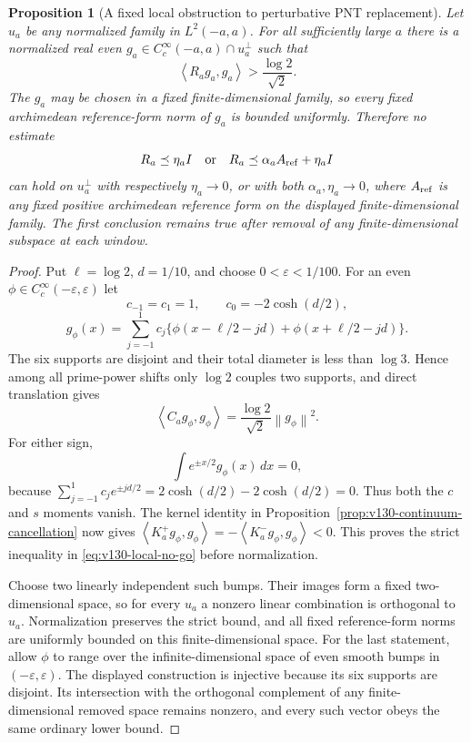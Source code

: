 \documentclass[11pt]{article}
\newtheorem{proposition}[theorem]{Proposition}
\theoremstyle{remark}
\newcommand{\norm}[1]{\left\lVert #1\right\rVert}
\newcommand{\ip}[2]{\left\langle #1,#2\right\rangle}
\begin{document}
\begin{proposition}[A fixed local obstruction to perturbative PNT replacement]
\label{prop:v130-local-no-go}
Let $u_a$ be any normalized family in $L^2(-a,a)$. For all sufficiently
large $a$ there is a normalized real even
$g_a\in C_c^\infty(-a,a)\cap u_a^\perp$ such that
\begin{equation}\label{eq:v130-local-no-go}
 \ip{R_ag_a}{g_a}>\frac{\log2}{\sqrt2}.
\end{equation}
The $g_a$ may be chosen in a fixed finite-dimensional family, so every
fixed archimedean reference-form norm of $g_a$ is bounded uniformly.
Therefore no estimate
\[
 R_a\preceq\eta_a I
 \quad\hbox{or}\quad
 R_a\preceq\alpha_a A_{\rm ref}+\eta_a I
\]
can hold on $u_a^\perp$ with respectively $\eta_a\to0$, or with both
$\alpha_a,\eta_a\to0$, where $A_{\rm ref}$ is any fixed positive
archimedean reference form on the displayed finite-dimensional family.
The first conclusion remains true after removal of any
finite-dimensional subspace at each window.
\end{proposition}
\begin{proof}
Put $\ell=\log2$, $d=1/10$, and choose
$0<\varepsilon<1/100$. For an even
$\phi\in C_c^\infty(-\varepsilon,\varepsilon)$ let
\[
 c_{-1}=c_1=1,\qquad c_0=-2\cosh(d/2),
\]
\[
 g_\phi(x)=\sum_{j=-1}^1c_j
 \{\phi(x-\ell/2-jd)+\phi(x+\ell/2-jd)\}.
\]
The six supports are disjoint and their total diameter is less than
$\log3$. Hence among all prime-power shifts only $\log2$ couples two
supports, and direct translation gives
\[
 \ip{C_ag_\phi}{g_\phi}
   =\frac{\log2}{\sqrt2}\norm{g_\phi}^2.
\]
For either sign,
\[
 \int e^{\pm x/2}g_\phi(x)\,dx=0,
\]
because
$\sum_{j=-1}^1c_je^{\pm jd/2}
=2\cosh(d/2)-2\cosh(d/2)=0$.
Thus both the $c$ and $s$ moments vanish. The kernel identity in
Proposition~\ref{prop:v130-continuum-cancellation} now gives
$\ip{K_a^+g_\phi}{g_\phi}=-\ip{K_a^-g_\phi}{g_\phi}<0$.
This proves the strict inequality in \eqref{eq:v130-local-no-go}
before normalization.

Choose two linearly independent such bumps. Their images form a fixed
two-dimensional space, so for every $u_a$ a nonzero linear combination
is orthogonal to $u_a$. Normalization preserves the strict bound, and
all fixed reference-form norms are uniformly bounded on this
finite-dimensional space. For the last statement, allow $\phi$ to
range over the infinite-dimensional space of even smooth bumps in
$(-\varepsilon,\varepsilon)$. The displayed construction is injective
because its six supports are disjoint. Its intersection with the
orthogonal complement of any finite-dimensional removed space remains
nonzero, and every such vector obeys the same ordinary lower bound.
\end{proof}
\end{document}
